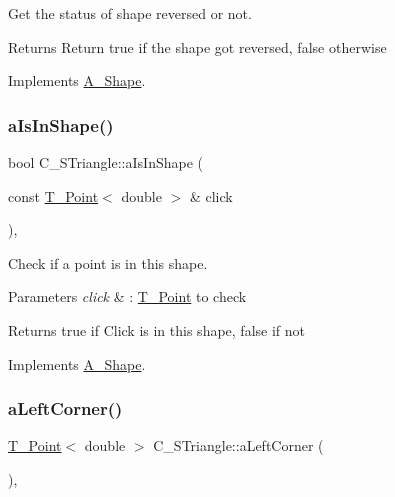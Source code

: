 Get the status of shape reversed or not. 

\begin{DoxyReturn}{Returns}
Return true if the shape got reversed, false otherwise 
\end{DoxyReturn}


Implements \hyperlink{classA__Shape_a24991f7667367b646cae75f60df22e28}{A\+\_\+\+Shape}.

\mbox{\label{classC__STriangle_a3bc82d7ea53a6a058b9fb49bbd89282c}} 
\subsubsection{\texorpdfstring{a\+Is\+In\+Shape()}{aIsInShape()}}
{\footnotesize\ttfamily bool C\+\_\+\+S\+Triangle\+::a\+Is\+In\+Shape (\begin{DoxyParamCaption}\item[{const \hyperlink{classT__Point}{T\+\_\+\+Point}$<$ double $>$ \&}]{click }\end{DoxyParamCaption})\hspace{0.3cm}{\ttfamily [override]}, {\ttfamily [virtual]}}



Check if a point is in this shape. 


\begin{DoxyParams}{Parameters}
{\em click} & \+: \hyperlink{classT__Point}{T\+\_\+\+Point} to check \\
\hline
\end{DoxyParams}
\begin{DoxyReturn}{Returns}
true if Click is in this shape, false if not 
\end{DoxyReturn}


Implements \hyperlink{classA__Shape_a63f825cbc9780208d9a137f5c14917d0}{A\+\_\+\+Shape}.

\mbox{\label{classC__STriangle_a8e580f80693ea6f66cca3782ced8e301}} 
\subsubsection{\texorpdfstring{a\+Left\+Corner()}{aLeftCorner()}}
{\footnotesize\ttfamily \hyperlink{classT__Point}{T\+\_\+\+Point}$<$ double $>$ C\+\_\+\+S\+Triangle\+::a\+Left\+Corner (\begin{DoxyParamCaption}{ }\end{DoxyParamCaption})\hspace{0.3cm}{\ttfamily [override]}, {\ttfamily [virtual]}}



